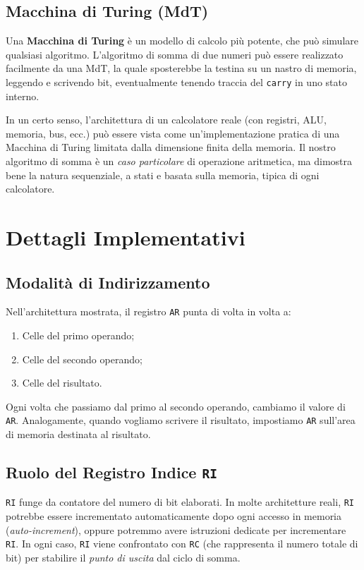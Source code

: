 \documentclass[a4paper,12pt]{report}
\begin{document}
\subsection{Macchina di Turing (MdT)}
Una \textbf{Macchina di Turing} è un modello di calcolo più potente, che può simulare qualsiasi algoritmo. L'algoritmo di somma di due numeri può essere realizzato facilmente da una MdT, la quale sposterebbe la testina su un nastro di memoria, leggendo e scrivendo bit, eventualmente tenendo traccia del \texttt{carry} in uno stato interno. 

In un certo senso, l'architettura di un calcolatore reale (con registri, ALU, memoria, bus, ecc.) può essere vista come un'implementazione pratica di una Macchina di Turing limitata dalla dimensione finita della memoria. Il nostro algoritmo di somma è un \textit{caso particolare} di operazione aritmetica, ma dimostra bene la natura sequenziale, a stati e basata sulla memoria, tipica di ogni calcolatore.

\section{Dettagli Implementativi}
\subsection{Modalità di Indirizzamento}
Nell'architettura mostrata, il registro \texttt{AR} punta di volta in volta a:
\begin{enumerate}
    \item Celle del primo operando;
    \item Celle del secondo operando;
    \item Celle del risultato.
\end{enumerate}
Ogni volta che passiamo dal primo al secondo operando, cambiamo il valore di \texttt{AR}. Analogamente, quando vogliamo scrivere il risultato, impostiamo \texttt{AR} sull'area di memoria destinata al risultato.

\subsection{Ruolo del Registro Indice \texttt{RI}}
\texttt{RI} funge da contatore del numero di bit elaborati. In molte architetture reali, \texttt{RI} potrebbe essere incrementato automaticamente dopo ogni accesso in memoria (\emph{auto-increment}), oppure potremmo avere istruzioni dedicate per incrementare \texttt{RI}. In ogni caso, \texttt{RI} viene confrontato con \texttt{RC} (che rappresenta il numero totale di bit) per stabilire il \emph{punto di uscita} dal ciclo di somma.
\end{document}
